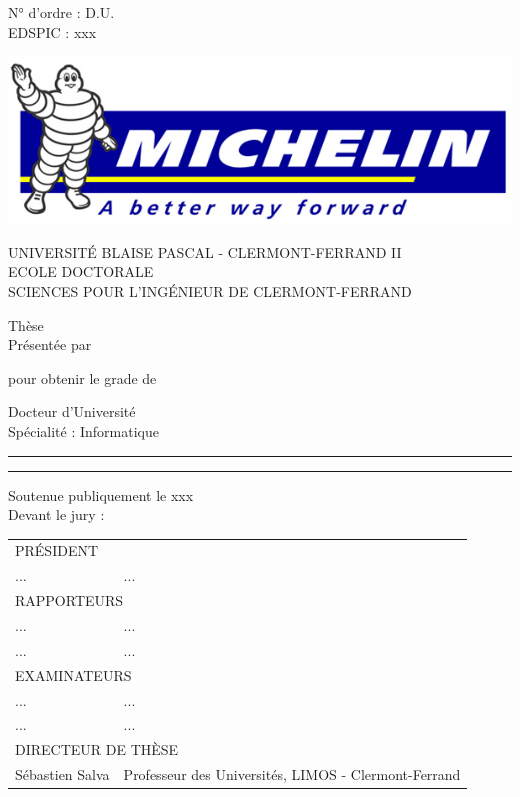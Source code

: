 %
\begin{titlepage}

    \begin{minipage}{0.3\textwidth}
        N° d'ordre : D.U.\\
        EDSPIC : xxx
    \end{minipage}
    \hfill
    \begin{minipage}{0.3\textwidth}
        \includegraphics[width=1.0\linewidth]{figures/michelin.jpg}
    \end{minipage}

	\center
    {\Large\uppercase{Universit\'e Blaise Pascal - Clermont-Ferrand II\\Ecole Doctorale\\Sciences pour l'Ing\'enieur de Clermont-Ferrand}\par}

    \hfill

    {\huge Thèse}\\
    Présentée par\\
    {\huge\thesisName\par}

    pour obtenir le grade de

    {\LARGE Docteur d'Université}\\
    Spécialité : Informatique\par

    \rule[5pt]{\textwidth}{.4pt}
    {\LARGE\thesisTitle \par}
    \rule[5pt]{\textwidth}{.4pt}\par

    \flushleft
    Soutenue publiquement le xxx\\
    Devant le jury :

    \begin{tabular}{l l}
        \multicolumn{2}{l}{\uppercase{Président}}\\
        ... & ... \\
        \multicolumn{2}{l}{\uppercase{Rapporteurs}}\\
        ... & ... \\
        ... & ... \\
        \multicolumn{2}{l}{\uppercase{Examinateurs}}\\
        ... & ... \\
        ... & ... \\
        \multicolumn{2}{l}{\uppercase{Directeur de thèse}}\\
        S\'ebastien Salva & Professeur des Universités, LIMOS - Clermont-Ferrand\\
    \end{tabular}

\end{titlepage}
